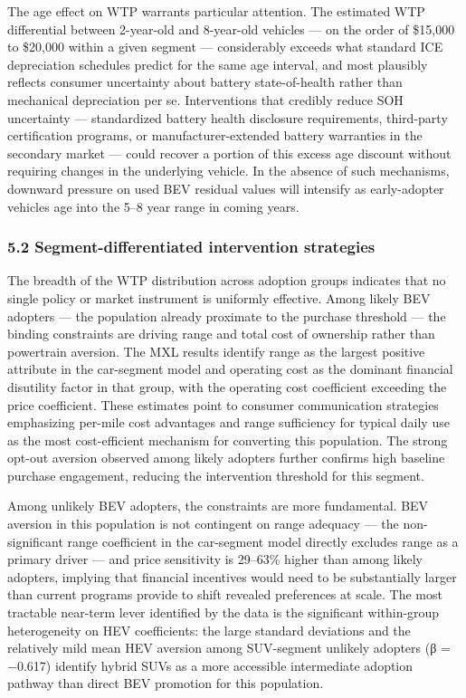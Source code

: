 \documentclass[
  letterpaper,
  DIV=11,
  numbers=noendperiod]{scrartcl}
\begin{document}
The age effect on WTP warrants particular attention. The estimated WTP
differential between 2-year-old and 8-year-old vehicles --- on the order
of \$15,000 to \$20,000 within a given segment --- considerably exceeds
what standard ICE depreciation schedules predict for the same age
interval, and most plausibly reflects consumer uncertainty about battery
state-of-health rather than mechanical depreciation per se.
Interventions that credibly reduce SOH uncertainty --- standardized
battery health disclosure requirements, third-party certification
programs, or manufacturer-extended battery warranties in the secondary
market --- could recover a portion of this excess age discount without
requiring changes in the underlying vehicle. In the absence of such
mechanisms, downward pressure on used BEV residual values will intensify
as early-adopter vehicles age into the 5--8 year range in coming years.

\subsubsection{5.2 Segment-differentiated intervention
strategies}\label{segment-differentiated-intervention-strategies}

The breadth of the WTP distribution across adoption groups indicates
that no single policy or market instrument is uniformly effective. Among
likely BEV adopters --- the population already proximate to the purchase
threshold --- the binding constraints are driving range and total cost
of ownership rather than powertrain aversion. The MXL results identify
range as the largest positive attribute in the car-segment model and
operating cost as the dominant financial disutility factor in that
group, with the operating cost coefficient exceeding the price
coefficient. These estimates point to consumer communication strategies
emphasizing per-mile cost advantages and range sufficiency for typical
daily use as the most cost-efficient mechanism for converting this
population. The strong opt-out aversion observed among likely adopters
further confirms high baseline purchase engagement, reducing the
intervention threshold for this segment.

Among unlikely BEV adopters, the constraints are more fundamental. BEV
aversion in this population is not contingent on range adequacy --- the
non-significant range coefficient in the car-segment model directly
excludes range as a primary driver --- and price sensitivity is 29--63\%
higher than among likely adopters, implying that financial incentives
would need to be substantially larger than current programs provide to
shift revealed preferences at scale. The most tractable near-term lever
identified by the data is the significant within-group heterogeneity on
HEV coefficients: the large standard deviations and the relatively mild
mean HEV aversion among SUV-segment unlikely adopters (β = −0.617)
identify hybrid SUVs as a more accessible intermediate adoption pathway
than direct BEV promotion for this population.
\end{document}
